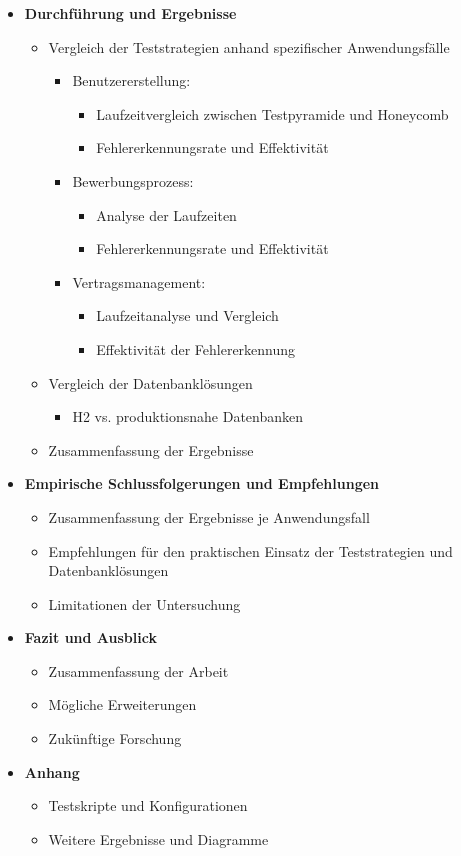 \begin{itemize}
	\item \textbf{Durchführung und Ergebnisse}
	\begin{itemize}
		\item Vergleich der Teststrategien anhand spezifischer Anwendungsfälle
		\begin{itemize}
			\item Benutzererstellung:
			\begin{itemize}
				\item Laufzeitvergleich zwischen Testpyramide und Honeycomb
				\item Fehlererkennungsrate und Effektivität
			\end{itemize}
			\item Bewerbungsprozess:
			\begin{itemize}
				\item Analyse der Laufzeiten
				\item Fehlererkennungsrate und Effektivität
			\end{itemize}
			\item Vertragsmanagement:
			\begin{itemize}
				\item Laufzeitanalyse und Vergleich
				\item Effektivität der Fehlererkennung
			\end{itemize}
		\end{itemize}
		\item Vergleich der Datenbanklösungen
		\begin{itemize}
			\item H2 vs. produktionsnahe Datenbanken
		\end{itemize}
		\item Zusammenfassung der Ergebnisse
	\end{itemize}
	
	\item \textbf{Empirische Schlussfolgerungen und Empfehlungen}
	\begin{itemize}
		\item Zusammenfassung der Ergebnisse je Anwendungsfall
		\item Empfehlungen für den praktischen Einsatz der Teststrategien und Datenbanklösungen
		\item Limitationen der Untersuchung
	\end{itemize}
	
	\item \textbf{Fazit und Ausblick}
	\begin{itemize}
		\item Zusammenfassung der Arbeit
		\item Mögliche Erweiterungen
		\item Zukünftige Forschung
	\end{itemize}
	
	\item \textbf{Anhang}
	\begin{itemize}
		\item Testskripte und Konfigurationen
		\item Weitere Ergebnisse und Diagramme
	\end{itemize}
\end{itemize}
